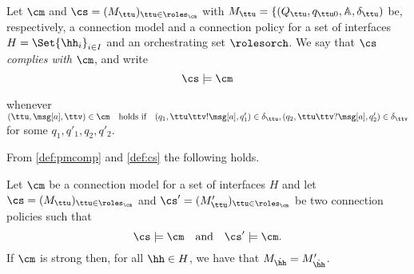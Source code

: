 \begin{definition}\label{def:pmcomp}
Let $\cm$ and $\cs=(M_\ttu)_{\ttu\in\roles_{\cm}}$ with $M_{\ttu} = \{(Q_{\ttu}, q_{\ttu0},\mathbb{A},\delta_{\ttu})$ be, respectively, a connection model and a  connection policy
for a set of interfaces $H=\Set{\hh_i}_{i\in I}$ and an orchestrating set $\rolesorch$.
We say that  $\cs$ {\em complies with} $\cm$, and write
$$
\cs\models \cm
$$

whenever\quad
$(\ttu,\msg[a],\ttv)\in\cm \text{\quad holds if\quad} (q_1,
{\ttu}{\ttv}!\msg[a],q'_1)\in\delta_{{\ttu}}, (q_2,{\ttu}{\ttv}?\msg[a],q'_2)\in\delta_{{\ttv}}$ for some $q_1,q'_1,q_2,q'_2$.

\end{definition}

\noindent
From \cref{def:pmcomp} and \cref{def:cs} the following holds.
\begin{lemma}\label{lem:ud}
Let $\cm$ be a connection model for a set of interfaces $H$ and let 
$\cs=(M_\ttu)_{\ttu\in\roles_{\cm}}$
and $\cs'=(M'_\ttu)_{\ttu\in\roles_{\cm}}$ be two  connection policies such that 
$$\cs\models \cm \quad\text{and}\quad \cs'\models \cm.$$
If  $\cm$ is strong then, for all $\hh\in H$, we have that $M_{\dot{\hh}}= M'_{\dot{\hh}}$.
\end{lemma}

